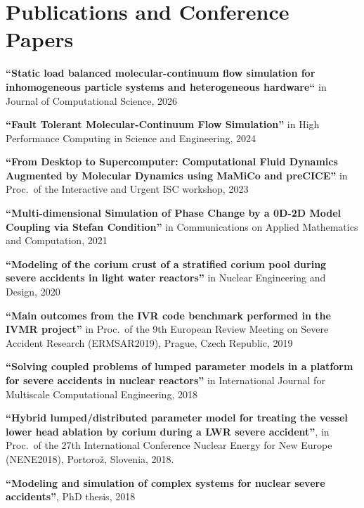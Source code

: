 \documentclass{article}
\renewenvironment{itemize}{
  \begin{list}{}{
      \setlength{\leftmargin}{1.5em}
      \setlength{\itemsep}{0.25em}
      \setlength{\parskip}{0pt}
      \setlength{\parsep}{0.25em}
    }
}{
  \end{list}
}
\begin{document}
\section*{Publications and Conference Papers}
\begin{itemize}
    \item \textbf{``Static load balanced molecular-continuum flow simulation for inhomogeneous particle systems and heterogeneous hardware``} in Journal of Computational Science, 2026
	\item \textbf{``Fault Tolerant Molecular-Continuum Flow Simulation''} in High Performance Computing in Science and Engineering, 2024
	\item \textbf{``From Desktop to Supercomputer: Computational Fluid Dynamics Augmented by Molecular Dynamics using MaMiCo and preCICE''} in Proc.~of the Interactive and Urgent ISC workshop, 2023
	\item \textbf{``Multi-dimensional Simulation of Phase Change by a 0D-2D Model Coupling via Stefan Condition''} in Communications on Applied Mathematics and Computation, 2021
	\item \textbf{``Modeling of the corium crust of a stratified corium pool during severe accidents in light water reactors''} in Nuclear Engineering and Design, 2020
	\item \textbf{``Main outcomes from the IVR code benchmark performed in the IVMR project''} in Proc.~of the 9th European Review Meeting on Severe Accident Research (ERMSAR2019),
Prague, Czech Republic, 2019
	\item \textbf{``Solving coupled problems of lumped parameter models in a platform for severe accidents in nuclear reactors''} in International Journal for Multiscale Computational Engineering, 2018
	\item \textbf{``Hybrid lumped/distributed parameter model for treating the vessel lower head ablation by corium during a LWR severe accident''}, in Proc.~of the 27th International Conference Nuclear Energy for New Europe (NENE2018), Portorož, Slovenia, 2018.
	\item \textbf{``Modeling and simulation of complex systems for nuclear severe accidents''}, PhD thesis, 2018
\end{itemize}  
\end{document}
